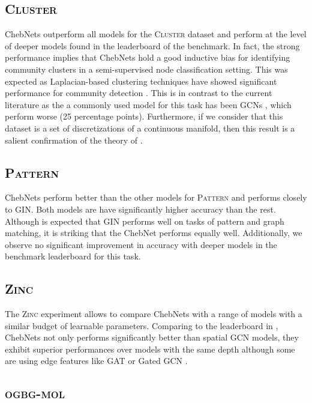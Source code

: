 \documentclass[letterpaper]{article} \usepackage{aaai21}  \usepackage{times}  \usepackage{helvet} \usepackage{courier}  \usepackage[hyphens]{url}  \usepackage{graphicx} \usepackage{natbib}  \usepackage{caption} \frenchspacing  \setlength{\pdfpagewidth}{8.5in}  \setlength{\pdfpageheight}{11in}
\begin{document}
\subsection{\textsc{Cluster}}
ChebNets outperform all models for the \textsc{Cluster} dataset and perform at the level of deeper models found in the leaderboard of the benchmark.
In fact, the strong performance implies that ChebNets hold a good inductive bias for identifying community clusters in a semi-supervised node classification setting. This was expected as Laplacian-based clustering techniques have showed significant performance for community detection \cite{von2007tutorial}. This is in contrast to the current literature as the a commonly used model for this task has been GCNs \cite{kipf_semi-supervised_2017}, which perform  worse (25 percentage points).
Furthermore, if we consider that this dataset is a set of discretizations of a continuous manifold, then this result is a salient confirmation of the theory of \cite{levie_transferability_2019-1}.

\subsection{\textsc{Pattern}}
ChebNets perform better than the other models for \textsc{Pattern} and performs closely to GIN. Both models are have significantly higher accuracy than the rest. Although is expected that GIN performs well on tasks of pattern and graph matching, it is striking that the ChebNet performs equally well. Additionally, we observe no significant improvement in accuracy with deeper models in the benchmark leaderboard for this task.


\subsection{\textsc{Zinc}}
The \textsc{Zinc} experiment allows to compare ChebNets with a range of models with a similar budget of learnable parameters. Comparing to the leaderboard in \cite{dwivedi_benchmarking_2020}, ChebNets not only performs significantly better than spatial GCN models, they exhibit superior performances over models with the same depth although some are using edge features like GAT or Gated GCN \cite{bresson_residual_2018}.


\subsection{\textsc{ogbg-mol}}
\end{document}
